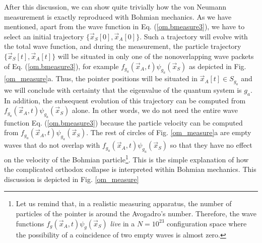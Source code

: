 \documentclass[nofootinbib, secnumarabic, amsmath, nobibnotes,10pt,aps,pra]{revtex4-1}
\newcommand{\fref}[1]{Fig. \ref{#1}}
\newcommand{\eref}[1]{Eq. (\ref{#1})}
\begin{document}
After this discussion, we can show quite trivially how the von
Neumann measurement is exactly reproduced with Bohmian mechanics. As
we have mentioned, apart from the wave function in \eref{om.bmeasure3}, we
have to select an initial trajectory $\{\vec x_S[0],\vec x_A[0]\}$.
Such a trajectory will evolve with the total wave function, and
during the measurement, the particle trajectory $\{\vec x_S[t],\vec
x_A[t]\}$ will be situated in only one of the nonoverlapping wave
packets of \eref{om.bmeasure3}, for example $f_{g_a}(\vec x_A,t)
\psi_{g_a}(\vec x_S)$ as depicted in \fref{om_measure}a. Thus, the
pointer positions will be situated in $\vec x_A[t]\in S_{g_a}$ and
we will conclude with certainty that the eigenvalue of the quantum
system is $g_a$. In addition, the subsequent evolution of this
trajectory can be computed from $f_{g_a}(\vec x_A,t) \psi_{g_a}(\vec
x_S)$ alone. In other words, we do not need the entire wave function
\eref{om.bmeasure3} because the particle velocity can be computed
from $f_{g_a}(\vec x_A,t) \psi_{g_a}(\vec x_S)$. The rest of circles
of \fref{om_measure}a are empty waves that do not overlap with
$f_{g_a}(\vec x_A,t) \psi_{g_a}(\vec x_S)$ so that they have no
effect on the velocity of the Bohmian particle\footnote{Let us remind that, in a realistic measuring apparatus, the number of particles of the pointer is around the Avogadro's number. Therefore, the wave functions $f_{g}(\vec x_A,t) \psi_{g}(\vec x_S)$ \emph{live} in a $N=10^{23}$ configuration space where the possibility of a coincidence of two empty waves is almost zero.}. This is the simple
explanation of how the complicated orthodox collapse is interpreted
within Bohmian mechanics. This discussion is depicted in
\fref{om_measure}
\end{document}
